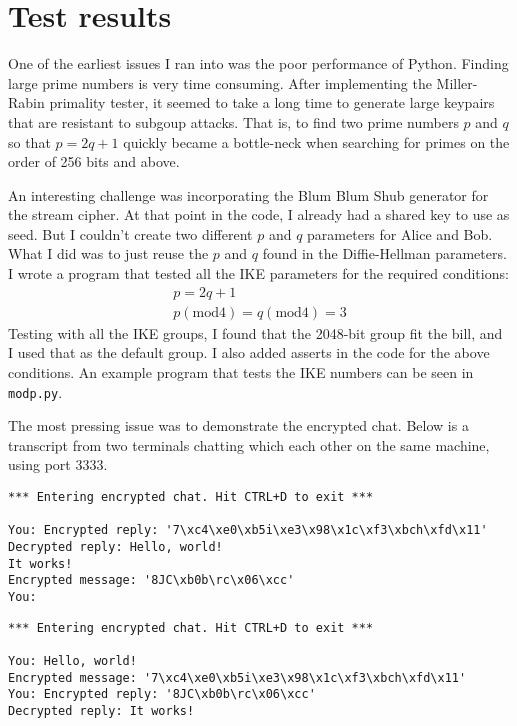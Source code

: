 \documentclass[a4paper,english,12pt]{article}
\begin{document}
\section{Test results}
One of the earliest issues I ran into was the poor performance of Python.
Finding large prime numbers is very time consuming. After implementing the
Miller-Rabin primality tester, it seemed to take a long time to generate large
keypairs that are resistant to subgoup attacks. That is, to find two prime
numbers $p$ and $q$ so that $p = 2q+1$ quickly became a bottle-neck when
searching for primes on the order of 256 bits and above.

An interesting challenge was incorporating the Blum Blum Shub generator for the
stream cipher. At that point in the code, I already had a shared key to use as
seed. But I couldn't create two different $p$ and $q$ parameters for Alice and
Bob. What I did was to just reuse the $p$ and $q$ found in the Diffie-Hellman
parameters. I wrote a program that tested all the IKE parameters for the
required conditions:
\begin{gather*}
  p = 2q+1 \\
  p (\textrm{mod} 4) = q (\textrm{mod} 4) = 3
\end{gather*}
Testing with all the IKE groups, I found that the 2048-bit group fit the bill,
and I used that as the default group. I also added asserts in the code for the
above conditions. An example program that tests the IKE numbers can be seen in
\texttt{modp.py}.

The most pressing issue was to demonstrate the encrypted chat. Below is a
transcript from two terminals chatting which each other on the same machine,
using port 3333.

\begin{lstlisting}
*** Entering encrypted chat. Hit CTRL+D to exit ***

You: Encrypted reply: '7\xc4\xe0\xb5i\xe3\x98\x1c\xf3\xbch\xfd\x11'
Decrypted reply: Hello, world!
It works!
Encrypted message: '8JC\xb0b\rc\x06\xcc'
You:
\end{lstlisting}

\begin{lstlisting}
*** Entering encrypted chat. Hit CTRL+D to exit ***

You: Hello, world!
Encrypted message: '7\xc4\xe0\xb5i\xe3\x98\x1c\xf3\xbch\xfd\x11'
You: Encrypted reply: '8JC\xb0b\rc\x06\xcc'
Decrypted reply: It works!
\end{lstlisting}
\end{document}
